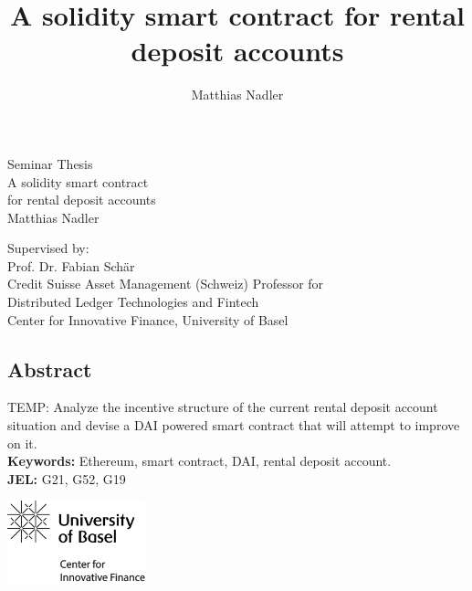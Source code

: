 \documentclass[12pt,a4paper,titlepage,oneside,english]{article}
\title{A solidity smart contract for rental deposit accounts}
\author{Matthias Nadler}
\begin{document}
\begin{center}
\vspace{1em}
\large{Seminar Thesis}\\
\huge A solidity smart contract \\
for rental deposit accounts \\
\Large \vspace{1em}
Matthias Nadler
\end{center}

\vspace{1em}
\normalsize
\begin{flushleft}
Supervised by:\\ 
Prof. Dr. Fabian Schär \\
Credit Suisse Asset Management (Schweiz) Professor for \\ 
Distributed Ledger Technologies and Fintech \\
Center for Innovative Finance, University of Basel
\end{flushleft}

\vspace{1em}
\onehalfspacing
\begin{center}
\section*{Abstract}
\end{center}
TEMP: Analyze the incentive structure of the current rental deposit account situation and devise
a DAI powered smart contract that will attempt to improve on it. \\
\vfill
\textbf{Keywords:} Ethereum, smart contract, DAI, rental deposit account.\\
\noindent\textbf{JEL:} G21, G52, G19




\newpage
{}
\tableofcontents

\vfill
\begin{center}
\includegraphics[width=4cm]{../assetlib/images/logo_cif.png}
\end{center}
\singlespacing
\vspace{-1.5cm}
\end{document}

